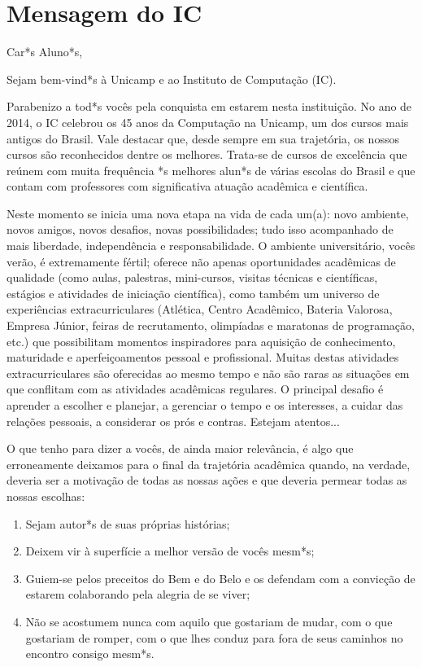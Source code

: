 
\section{Mensagem do IC}

Car*s Aluno*s,

Sejam bem-vind*s à Unicamp e ao Instituto de Computação (IC).

Parabenizo a tod*s vocês pela conquista em estarem nesta instituição. No ano de
2014, o IC celebrou os 45 anos da Computação na Unicamp, um dos cursos mais
antigos do Brasil. Vale destacar que, desde sempre em sua trajetória, os nossos
cursos são reconhecidos dentre os melhores.  Trata-se de cursos de excelência
que reúnem com muita frequência *s melhores alun*s de várias escolas do Brasil e
que contam com professores com significativa atuação acadêmica e científica.

Neste momento se inicia uma nova etapa na vida de cada um(a): novo ambiente, novos
amigos, novos desafios, novas possibilidades; tudo isso acompanhado de mais
liberdade, independência e responsabilidade.  O ambiente universitário, vocês
verão, é extremamente fértil; oferece não apenas oportunidades acadêmicas de
qualidade (como aulas, palestras, mini-cursos, visitas técnicas e científicas,
estágios e atividades de iniciação científica), como também um universo de
experiências extracurriculares (Atlética, Centro Acadêmico, Bateria Valorosa,
Empresa Júnior, feiras de recrutamento, olimpíadas e maratonas de programação,
etc.) que possibilitam momentos inspiradores para aquisição de conhecimento,
maturidade e aperfeiçoamentos pessoal e profissional. Muitas destas atividades
extracurriculares são oferecidas ao mesmo tempo e não são raras as situações em
que conflitam com as atividades acadêmicas regulares. O principal desafio é
aprender a escolher e planejar, a gerenciar o tempo e os interesses, a cuidar
das relações pessoais, a considerar os prós e contras. Estejam atentos...

O que tenho para dizer a vocês, de ainda maior relevância, é algo que
erroneamente deixamos para o final da trajetória acadêmica quando, na verdade,
deveria ser a motivação de todas as nossas ações e que deveria permear todas as
nossas escolhas:

\begin{enumerate}
\item Sejam autor*s de suas próprias histórias;

\item Deixem vir à superfície a melhor versão de vocês mesm*s;

\item Guiem-se pelos preceitos do Bem e do Belo e os defendam com a convicção de
  estarem colaborando pela alegria de se viver;

\item Não se acostumem nunca com aquilo que gostariam de mudar, com o que
  gostariam de romper, com o que lhes conduz para fora de seus caminhos no
  encontro consigo mesm*s.
\end{enumerate}

